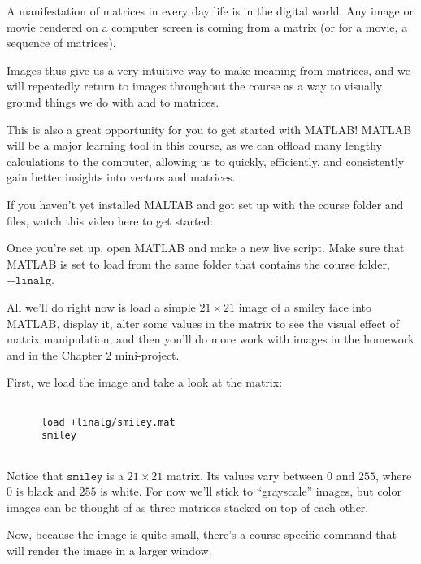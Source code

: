 \documentclass{ximera}
\begin{document}
\begin{exploration}

  A manifestation of matrices in every day life is in the digital world. Any image or movie rendered on a computer screen is coming from a matrix (or for a movie, a sequence of matrices).
  
  Images thus give us a very intuitive way to make meaning from matrices, and we will repeatedly return to images throughout the course as a way to visually ground things we do with and to matrices.
  
  \begin{example}
  
    This is also a great opportunity for you to get started with MATLAB! MATLAB will be a major learning tool in this course, as we can offload many lengthy calculations to the computer, allowing us to quickly, efficiently, and consistently gain better insights into vectors and matrices.
  
    If you haven't yet installed MALTAB and got set up with the course folder and files, watch this video here to get started:
  
  
    Once you're set up, open MATLAB and make a new live script. Make sure that MATLAB is set to load from the same folder that contains the course folder, $\texttt{+linalg}$.
  
    All we'll do right now is load a simple $21\times 21$ image of a smiley face into MATLAB, display it, alter some values in the matrix to see the visual effect of matrix manipulation, and then you'll do more work with images in the homework and in the Chapter 2 mini-project.
  
    First, we load the image and take a look at the matrix:
  
    \begin{verbatim}
    
      load +linalg/smiley.mat
      smiley
  
    \end{verbatim}
  
    Notice that $\texttt{smiley}$ is a $21\times 21$ matrix. Its values vary between $0$ and $255$, where $0$ is black and $255$ is white. For now we'll stick to ``grayscale'' images, but color images can be thought of as three matrices stacked on top of each other.
  
    Now, because the image is quite small, there's a course-specific command that will render the image in a larger window. 
  

\end{example}
\end{exploration}
\end{document}
